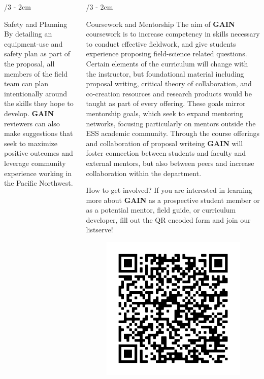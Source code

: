 \documentclass[landscape]{uwposter}
\begin{document}
\begin{frame}
\begin{columns}[onlytextwidth]
\begin{column}{\textwidth/3 - 2cm}
\begin{block}{Safety and Planning}
	By detailing an equipment-use and safety plan as part of the proposal, all members of the field team can plan intentionally around the skills they hope to develop.
	\textbf{\alert{GAIN}} reviewers can also make suggestions that seek to maximize positive outcomes and leverage community experience working in the Pacific Northwest.
    \end{block}


  \end{column}


\begin{column}{\textwidth/3 - 2cm}
    \begin{block}{Coursework and Mentorship}
        The aim of  \textbf{\alert{GAIN}} coursework is to increase competency in skills necessary to conduct effective fieldwork, and give students experience proposing field-science related questions. Certain elements of the curriculum will change with the instructor, but foundational material including proposal writing, critical theory of collaboration, and co-creation resources and research products would be taught as part of every offering. These goals mirror mentorship goals, which seek to expand mentoring networks, focusing particularly on mentors outside the ESS academic community. Through the course offerings and collaboration of proposal writeing \textbf{\alert{GAIN}}  will foster connection between students and faculty and external mentors, but also between peers and increase collaboration within the department.

    \end{block}



    \begin{alertblock}{How to get involved?}
        If you are interested in learning more about \textbf{\alert{GAIN}} as a prospective student member or as a potential mentor, field guide, or curriculum developer, fill out the QR encoded form and join our listserve!
        \begin{figure}
        \includegraphics[width=.4\linewidth]{uwposter-images/frame.png}
        \label{fig:qrcode}
        \end{figure}
        

\end{alertblock}
\end{column}
\end{columns}
\end{frame}
\end{document}
